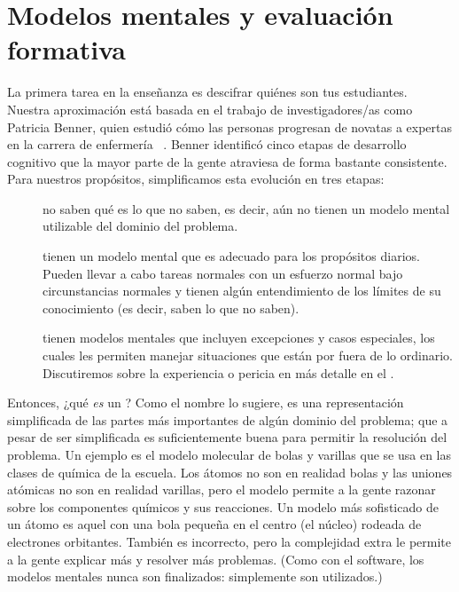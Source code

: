 \chapter{Modelos mentales y evaluación formativa}\label{s:models}

La primera tarea en la enseñanza es descifrar quiénes son tus estudiantes.
Nuestra aproximación está basada en el trabajo de investigadores/as como Patricia Benner,
quien estudió cómo las personas progresan de novatas a expertas en la carrera de enfermería ~\cite{Benn2000}.
Benner identificó cinco etapas de desarrollo cognitivo que la mayor parte de la gente atraviesa de forma bastante consistente.
Para nuestros propósitos, simplificamos esta evolución en tres etapas:

\begin{description}

\item[]
no saben qué es lo que no saben,
es decir, aún no tienen un modelo mental utilizable del dominio del problema.  

\item[]
tienen un modelo mental que es adecuado para los propósitos diarios.
Pueden llevar a cabo tareas normales con un esfuerzo normal bajo circunstancias normales
y tienen algún entendimiento de los límites de su conocimiento
(es decir, saben lo que no saben).

\item[]
  tienen modelos mentales que incluyen excepciones y casos especiales,
  los cuales les permiten manejar situaciones que están por fuera de lo ordinario.
Discutiremos sobre la experiencia o pericia en más detalle en el .

\end{description}

Entonces, ¿qué \emph{es} un ?
Como el nombre lo sugiere,
es una representación simplificada de las partes más importantes de algún dominio del problema;
que a pesar de ser simplificada es suficientemente buena para permitir la resolución del problema.
Un ejemplo es el modelo molecular de bolas y varillas que se usa en las clases de química de la escuela.
Los átomos no son en realidad bolas
y las uniones atómicas no son en realidad varillas,
pero el modelo permite a la gente razonar sobre los componentes químicos y sus reacciones.
Un modelo más sofisticado de un átomo es aquel con una bola pequeña en el centro (el núcleo) rodeada de electrones orbitantes. 
También es incorrecto,
pero la complejidad extra le permite a la gente explicar más y resolver más problemas.
(Como con el software, 
los modelos mentales nunca son finalizados:
simplemente son utilizados.)

